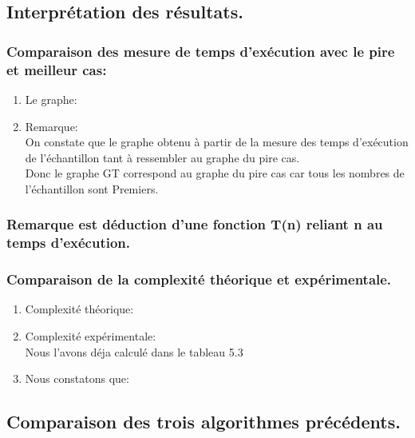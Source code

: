 \documentclass[12pt]{article}
\begin{document}
\subsection{Interprétation des résultats.}
\subsubsection{Comparaison des mesure de temps d'exécution avec le pire et meilleur cas:}
\begin{enumerate}
	\item Le graphe:
	\\

	\item Remarque:
	\\
	On constate que le graphe obtenu à partir de la mesure des temps d'exécution de l'échantillon tant à ressembler au graphe du pire cas.
	\\
	Donc le graphe GT correspond au graphe du pire cas car tous les nombres de l'échantillon sont Premiers.
	
\end{enumerate}

\subsubsection{Remarque est déduction d'une fonction T(n) reliant n au temps d'exécution.}

\subsubsection{Comparaison de la complexité théorique et expérimentale. }
\begin{enumerate}

	\item Complexité théorique:\\


	\item Complexité expérimentale:\\
	
	Nous l'avons déja calculé dans le tableau 5.3
	
	\item Nous constatons que:\\
	
	
\end{enumerate}



\subsection{Comparaison des trois algorithmes précédents.}
\end{document}
